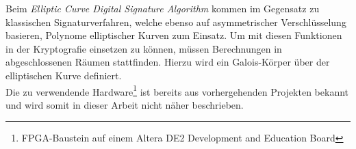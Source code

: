 Beim \textit{Elliptic Curve Digital Signature Algorithm} kommen im Gegensatz zu klassischen Signaturverfahren, welche ebenso auf asymmetrischer Verschlüsselung basieren, Polynome elliptischer Kurven zum Einsatz. Um mit diesen Funktionen in der Kryptografie einsetzen zu können, müssen Berechnungen in abgeschlossenen Räumen stattfinden. Hierzu wird ein Galois-Körper über der elliptischen Kurve definiert. \\


Die zu verwendende Hardware\footnote{FPGA-Baustein auf einem Altera DE2 Development and Education Board} ist bereits aus vorhergehenden Projekten bekannt und wird somit in dieser Arbeit nicht näher beschrieben. 
